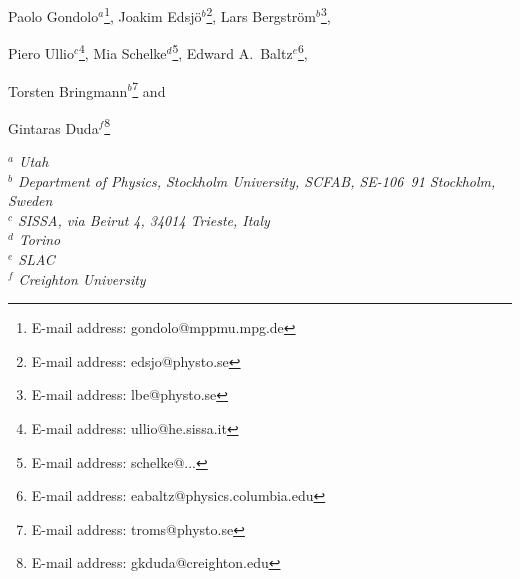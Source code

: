 {\Large \bfseries
\centerline{
Paolo Gondolo$^a$\footnote{E-mail address: gondolo@mppmu.mpg.de},
Joakim Edsj\"o$^b$\footnote{E-mail address: edsjo@physto.se},
Lars Bergstr\"om$^b$\footnote{E-mail address: lbe@physto.se},}
\smallskip
\centerline{
Piero Ullio$^c$\footnote{E-mail address: ullio@he.sissa.it},
Mia Schelke$^d$\footnote{E-mail address: schelke@...},
Edward A.~Baltz$^e$\footnote{E-mail address: eabaltz@physics.columbia.edu},}
\smallskip
\centerline{
Torsten Bringmann$^b$\footnote{E-mail address: troms@physto.se} and}
\smallskip
\centerline{Gintaras Duda$^f$\footnote{E-mail address: gkduda@creighton.edu}}
}

\bigskip
\bigskip

\begin{centering}
\em 
{}$^a$ Utah\\
\smallskip
{}$^b$ Department of Physics, Stockholm University, SCFAB, SE-106~91
Stockholm, Sweden\\
\smallskip
{}$^c$ SISSA, via Beirut 4, 34014 Trieste, Italy\\
\smallskip
{}$^d$ Torino\\
\smallskip
{}$^e$ SLAC\\
\smallskip
{}$^f$ Creighton University\\
%
\end{centering}

